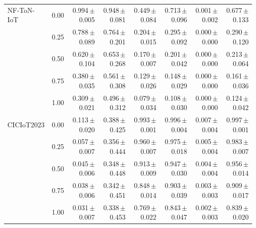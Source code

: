 \begin{table}[tbp]
\begin{tabular}{ll rr rrrr}
\midrule
NF-ToN-IoT & 0.00 & 0.994\,{\footnotesize$\pm$0.005} & 0.948\,{\footnotesize$\pm$0.081} & 0.449\,{\footnotesize$\pm$0.084} & 0.713\,{\footnotesize$\pm$0.096} & 0.001\,{\footnotesize$\pm$0.002} & 0.677\,{\footnotesize$\pm$0.133} \\
 & 0.25 & 0.788\,{\footnotesize$\pm$0.089} & 0.764\,{\footnotesize$\pm$0.201} & 0.204\,{\footnotesize$\pm$0.015} & 0.295\,{\footnotesize$\pm$0.092} & 0.000\,{\footnotesize$\pm$0.000} & 0.290\,{\footnotesize$\pm$0.120} \\
 & 0.50 & 0.620\,{\footnotesize$\pm$0.104} & 0.653\,{\footnotesize$\pm$0.268} & 0.170\,{\footnotesize$\pm$0.007} & 0.201\,{\footnotesize$\pm$0.042} & 0.000\,{\footnotesize$\pm$0.000} & 0.213\,{\footnotesize$\pm$0.064} \\
 & 0.75 & 0.380\,{\footnotesize$\pm$0.035} & 0.561\,{\footnotesize$\pm$0.308} & 0.129\,{\footnotesize$\pm$0.026} & 0.148\,{\footnotesize$\pm$0.029} & 0.000\,{\footnotesize$\pm$0.000} & 0.161\,{\footnotesize$\pm$0.036} \\
 & 1.00 & 0.309\,{\footnotesize$\pm$0.021} & 0.496\,{\footnotesize$\pm$0.312} & 0.079\,{\footnotesize$\pm$0.034} & 0.108\,{\footnotesize$\pm$0.030} & 0.000\,{\footnotesize$\pm$0.000} & 0.124\,{\footnotesize$\pm$0.042} \\
\midrule
CICIoT2023 & 0.00 & 0.113\,{\footnotesize$\pm$0.020} & 0.388\,{\footnotesize$\pm$0.425} & 0.993\,{\footnotesize$\pm$0.001} & 0.996\,{\footnotesize$\pm$0.004} & 0.007\,{\footnotesize$\pm$0.004} & 0.997\,{\footnotesize$\pm$0.001} \\
 & 0.25 & 0.057\,{\footnotesize$\pm$0.007} & 0.356\,{\footnotesize$\pm$0.444} & 0.960\,{\footnotesize$\pm$0.007} & 0.975\,{\footnotesize$\pm$0.018} & 0.005\,{\footnotesize$\pm$0.004} & 0.983\,{\footnotesize$\pm$0.007} \\
 & 0.50 & 0.045\,{\footnotesize$\pm$0.006} & 0.348\,{\footnotesize$\pm$0.448} & 0.913\,{\footnotesize$\pm$0.009} & 0.947\,{\footnotesize$\pm$0.030} & 0.004\,{\footnotesize$\pm$0.004} & 0.956\,{\footnotesize$\pm$0.014} \\
 & 0.75 & 0.038\,{\footnotesize$\pm$0.006} & 0.342\,{\footnotesize$\pm$0.451} & 0.848\,{\footnotesize$\pm$0.014} & 0.903\,{\footnotesize$\pm$0.039} & 0.003\,{\footnotesize$\pm$0.003} & 0.909\,{\footnotesize$\pm$0.017} \\
 & 1.00 & 0.031\,{\footnotesize$\pm$0.007} & 0.338\,{\footnotesize$\pm$0.453} & 0.769\,{\footnotesize$\pm$0.022} & 0.843\,{\footnotesize$\pm$0.047} & 0.002\,{\footnotesize$\pm$0.003} & 0.839\,{\footnotesize$\pm$0.020} \\
\bottomrule
\end{tabular}
\end{table}
